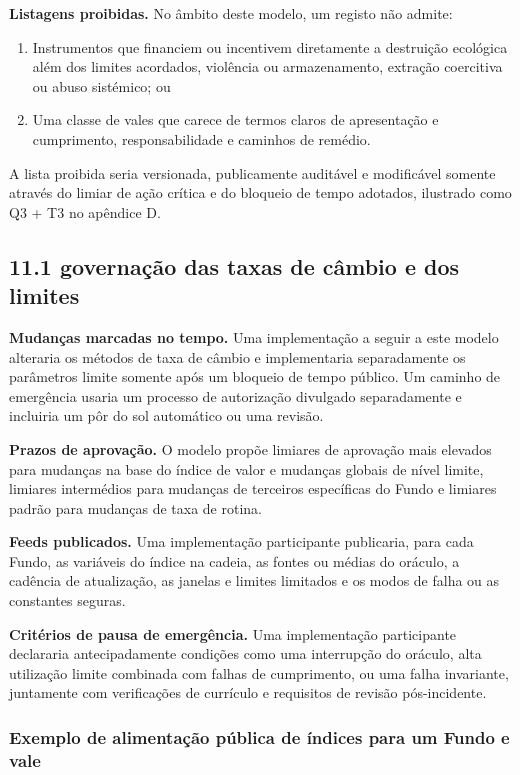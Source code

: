 \documentclass[11pt]{article}
\begin{document}
\textbf{Listagens proibidas.} No âmbito deste modelo, um registo não admite:

\begin{enumerate}[leftmargin=*]
\item Instrumentos que financiem ou incentivem diretamente a destruição ecológica além dos limites acordados, violência ou armazenamento, extração coercitiva ou abuso sistémico; ou
\item Uma classe de vales que carece de termos claros de apresentação e cumprimento, responsabilidade e caminhos de remédio.
\end{enumerate}
A lista proibida seria versionada, publicamente auditável e modificável somente através do limiar de ação crítica e do bloqueio de tempo adotados, ilustrado como Q3 + T3 no apêndice D.

\subsection*{11.1 governação das taxas de câmbio e dos limites}

\textbf{Mudanças marcadas no tempo.} Uma implementação a seguir a este modelo alteraria os métodos de taxa de câmbio e implementaria separadamente os parâmetros limite somente após um bloqueio de tempo público. Um caminho de emergência usaria um processo de autorização divulgado separadamente e incluiria um pôr do sol automático ou uma revisão.

\textbf{Prazos de aprovação.} O modelo propõe limiares de aprovação mais elevados para mudanças na base do índice de valor e mudanças globais de nível limite, limiares intermédios para mudanças de terceiros específicas do Fundo e limiares padrão para mudanças de taxa de rotina.

\textbf{Feeds publicados.} Uma implementação participante publicaria, para cada Fundo, as variáveis do índice na cadeia, as fontes ou médias do oráculo, a cadência de atualização, as janelas e limites limitados e os modos de falha ou as constantes seguras.

\textbf{Critérios de pausa de emergência.} Uma implementação participante declararia antecipadamente condições como uma interrupção do oráculo, alta utilização limite combinada com falhas de cumprimento, ou uma falha invariante, juntamente com verificações de currículo e requisitos de revisão pós-incidente.

\subsubsection*{Exemplo de alimentação pública de índices para um Fundo e vale}
\end{document}
